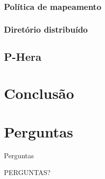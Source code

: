 \documentclass{beamer}
\begin{document}
\subsubsection{Política de mapeamento}

\subsubsection{Diretório distribuído}

\subsection{P-Hera}


\section{Conclusão}


\section{Perguntas}

\begin{frame}{Perguntas}
	\begin{center}		
		\Huge PERGUNTAS?
	\end{center}
	
\end{frame}
\end{document}
